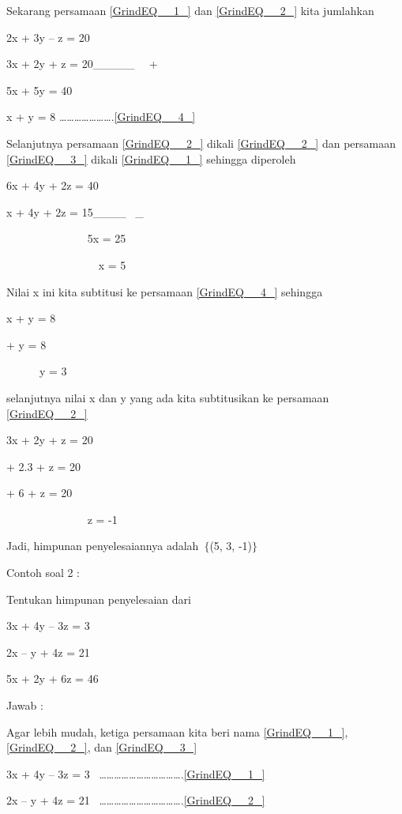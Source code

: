 \documentclass[11pt,fleqn]{book} %
\begin{document}
\noindent Sekarang persamaan \eqref{GrindEQ__1_} dan \eqref{GrindEQ__2_} kita jumlahkan

\noindent 2x + 3y -- z = 20

\noindent 3x + 2y + z = 20\_\_\_\_\_~~ +

\noindent 5x + 5y = 40

\noindent x + y = 8 {\dots}{\dots}{\dots}{\dots}{\dots}{\dots}{\dots}.\eqref{GrindEQ__4_}

\noindent Selanjutnya persamaan \eqref{GrindEQ__2_} dikali \eqref{GrindEQ__2_} dan persamaan \eqref{GrindEQ__3_} dikali \eqref{GrindEQ__1_} sehingga diperoleh

\noindent 6x + 4y + 2z = 40

\noindent x + 4y + 2z = 15\_\_\_\_~ \_

\noindent ~~~~~~~~~~~~~~ 5x = 25

\noindent ~~~~~~~~~~~~~~~~ x = 5

\noindent Nilai x ini kita subtitusi ke persamaan \eqref{GrindEQ__4_} sehingga

\noindent x + y = 8

 + y = 8

\noindent ~ ~ ~~ y = 3

\noindent selanjutnya nilai x dan y yang ada kita subtitusikan ke persamaan \eqref{GrindEQ__2_}

\noindent 3x + 2y + z = 20

 + 2.3 + z = 20

 + 6 + z = 20

\noindent ~~~~~~~~~~~~~~ z = -1

\noindent Jadi, himpunan penyelesaiannya adalah~$\{$(5, 3, -1)$\}$

\noindent Contoh soal 2 :

\noindent Tentukan himpunan penyelesaian dari

\noindent 3x + 4y -- 3z = 3

\noindent 2x -- y + 4z = 21

\noindent 5x + 2y + 6z = 46

\noindent Jawab :

\noindent Agar lebih mudah, ketiga persamaan kita beri nama \eqref{GrindEQ__1_}, \eqref{GrindEQ__2_}, dan \eqref{GrindEQ__3_}

\noindent 3x + 4y -- 3z = 3~ {\dots}{\dots}{\dots}{\dots}{\dots}{\dots}{\dots}{\dots}{\dots}{\dots}{\dots}.\eqref{GrindEQ__1_}

\noindent 2x -- y + 4z = 21~ {\dots}{\dots}{\dots}{\dots}{\dots}{\dots}{\dots}{\dots}{\dots}{\dots}{\dots}.\eqref{GrindEQ__2_}
\end{document}
